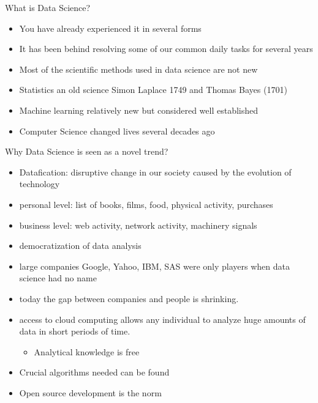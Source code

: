 \begin{frame}{What is Data Science?}
\protect\hypertarget{what-is-data-science-1}{}
\begin{itemize}[<+->]
\tightlist
\item
  You have \alert{already experienced} it in \alert{several forms}
\item
  It has been behind resolving some of our common daily tasks for
  several years
\item
  Most of the scientific methods used in data science are not new
\item
  Statistics an old science Simon Laplace 1749 and Thomas Bayes (1701)
\item
  Machine learning relatively new but considered well established
\item
  Computer Science changed lives several decades ago
\end{itemize}
\end{frame}

\begin{frame}{Why Data Science is seen as a novel trend?}
\protect\hypertarget{why-data-science-is-seen-as-a-novel-trend}{}
\begin{itemize}[<+->]
\tightlist
\item
  Datafication: disruptive change in our society caused by the evolution
  of technology
\item
  personal level: list of books, films, food, physical activity,
  purchases
\item
  business level: web activity, network activity, machinery signals
\item
  democratization of data analysis
\item
  large companies Google, Yahoo, IBM, SAS were only players when data
  science had no name
\item
  today the gap between companies and people is shrinking.
\item
  access to cloud computing allows any individual to analyze huge
  amounts of data in short periods of time.

  \begin{itemize}[<+->]
  \tightlist
  \item
    Analytical knowledge is free
  \end{itemize}
\item
  Crucial algorithms needed can be found
\item
  Open source development is the norm
\end{itemize}
\end{frame}

